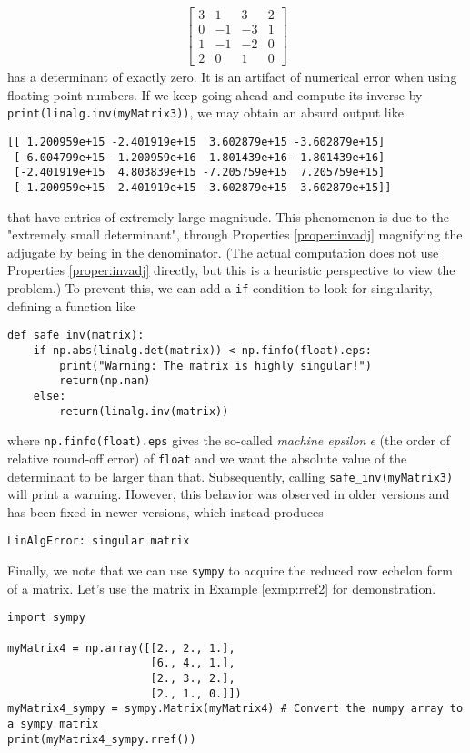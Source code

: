 \begin{align*}
\begin{bmatrix}
3 & 1 & 3 & 2 \\
0 & -1 & -3 & 1 \\
1 & -1 & -2 & 0 \\
2 & 0 & 1 & 0    
\end{bmatrix}
\end{align*}
has a determinant of exactly zero. It is an artifact of numerical error when using floating point numbers. If we keep going ahead and compute its inverse by \verb|print(linalg.inv(myMatrix3))|, we may obtain an absurd output like
\begin{lstlisting}
[[ 1.200959e+15 -2.401919e+15  3.602879e+15 -3.602879e+15]
 [ 6.004799e+15 -1.200959e+16  1.801439e+16 -1.801439e+16]
 [-2.401919e+15  4.803839e+15 -7.205759e+15  7.205759e+15]
 [-1.200959e+15  2.401919e+15 -3.602879e+15  3.602879e+15]]
\end{lstlisting}
that have entries of extremely large magnitude. This phenomenon is due to the "extremely small determinant", through Properties \ref{proper:invadj} magnifying the adjugate by being in the denominator. (The actual computation does not use Properties \ref{proper:invadj} directly, but this is a heuristic perspective to view the problem.) To prevent this, we can add a \verb|if| condition to look for singularity, defining a function like
\begin{lstlisting}
def safe_inv(matrix):
    if np.abs(linalg.det(matrix)) < np.finfo(float).eps:
        print("Warning: The matrix is highly singular!")
        return(np.nan)
    else:
        return(linalg.inv(matrix))
\end{lstlisting}
where \verb|np.finfo(float).eps| gives the so-called \textit{machine epsilon} $\epsilon$ (the order of relative round-off error) of \verb|float| and we want the absolute value of the determinant to be larger than that. Subsequently, calling \verb|safe_inv(myMatrix3)| will print a warning. However, this behavior was observed in older versions and has been fixed in newer versions, which instead produces
\begin{lstlisting}
LinAlgError: singular matrix    
\end{lstlisting}
Finally, we note that we can use \verb|sympy| to acquire the reduced row echelon form of a matrix. Let's use the matrix in Example \ref{exmp:rref2} for demonstration.
\begin{lstlisting}
import sympy

myMatrix4 = np.array([[2., 2., 1.],
                      [6., 4., 1.],
                      [2., 3., 2.],
                      [2., 1., 0.]])
myMatrix4_sympy = sympy.Matrix(myMatrix4) # Convert the numpy array to a sympy matrix
print(myMatrix4_sympy.rref())
\end{lstlisting}
